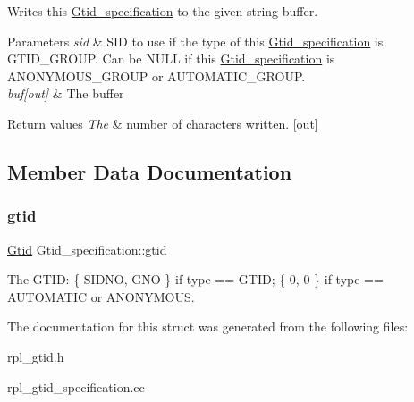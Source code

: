 Writes this \mbox{\hyperlink{structGtid__specification}{Gtid\+\_\+specification}} to the given string buffer.


\begin{DoxyParams}{Parameters}
{\em sid} & S\+ID to use if the type of this \mbox{\hyperlink{structGtid__specification}{Gtid\+\_\+specification}} is G\+T\+I\+D\+\_\+\+G\+R\+O\+UP. Can be N\+U\+LL if this \mbox{\hyperlink{structGtid__specification}{Gtid\+\_\+specification}} is A\+N\+O\+N\+Y\+M\+O\+U\+S\+\_\+\+G\+R\+O\+UP or A\+U\+T\+O\+M\+A\+T\+I\+C\+\_\+\+G\+R\+O\+UP. \\
\hline
{\em buf\mbox{[}out\mbox{]}} & The buffer \\
\hline
\end{DoxyParams}

\begin{DoxyRetVals}{Return values}
{\em The} & number of characters written. \mbox{[}out\mbox{]} \\
\hline
\end{DoxyRetVals}


\subsection{Member Data Documentation}
\mbox{\label{structGtid__specification_a4f1f94ceca9d1f0088a929df35c89c01}} 
\subsubsection{\texorpdfstring{gtid}{gtid}}
{\footnotesize\ttfamily \mbox{\hyperlink{structGtid}{Gtid}} Gtid\+\_\+specification\+::gtid}

The G\+T\+ID\+: \{ S\+I\+D\+NO, G\+NO \} if type == G\+T\+ID; \{ 0, 0 \} if type == A\+U\+T\+O\+M\+A\+T\+IC or A\+N\+O\+N\+Y\+M\+O\+US. 

The documentation for this struct was generated from the following files\+:\begin{DoxyCompactItemize}
\item 
rpl\+\_\+gtid.\+h\item 
rpl\+\_\+gtid\+\_\+specification.\+cc\end{DoxyCompactItemize}
